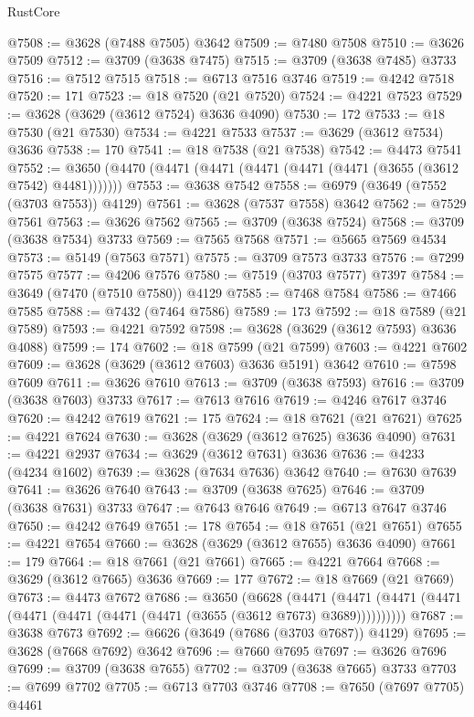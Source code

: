 \begin{lexlean}{RustCore}
\begin{coremodule}
@7508 := @3628 (@7488 @7505) @3642
@7509 := @7480 @7508
@7510 := @3626 @7509
@7512 := @3709 (@3638 @7475)
@7515 := @3709 (@3638 @7485) @3733
@7516 := @7512 @7515
@7518 := @6713 @7516 @3746
@7519 := @4242 @7518
@7520 := 171
@7523 := @18 @7520 (@21 @7520)
@7524 := @4221 @7523
@7529 := @3628 (@3629 (@3612 @7524) @3636 @4090)
@7530 := 172
@7533 := @18 @7530 (@21 @7530)
@7534 := @4221 @7533
@7537 := @3629 (@3612 @7534) @3636
@7538 := 170
@7541 := @18 @7538 (@21 @7538)
@7542 := @4473 @7541
@7552 := @3650 (@4470 (@4471 (@4471 (@4471 (@4471 (@4471 (@3655 (@3612 @7542) @4481)))))))
@7553 := @3638 @7542
@7558 := @6979 (@3649 (@7552 (@3703 @7553)) @4129)
@7561 := @3628 (@7537 @7558) @3642
@7562 := @7529 @7561
@7563 := @3626 @7562
@7565 := @3709 (@3638 @7524)
@7568 := @3709 (@3638 @7534) @3733
@7569 := @7565 @7568
@7571 := @5665 @7569 @4534
@7573 := @5149 (@7563 @7571)
@7575 := @3709 @7573 @3733
@7576 := @7299 @7575
@7577 := @4206 @7576
@7580 := @7519 (@3703 @7577) @7397
@7584 := @3649 (@7470 (@7510 @7580)) @4129
@7585 := @7468 @7584
@7586 := @7466 @7585
@7588 := @7432 (@7464 @7586)
@7589 := 173
@7592 := @18 @7589 (@21 @7589)
@7593 := @4221 @7592
@7598 := @3628 (@3629 (@3612 @7593) @3636 @4088)
@7599 := 174
@7602 := @18 @7599 (@21 @7599)
@7603 := @4221 @7602
@7609 := @3628 (@3629 (@3612 @7603) @3636 @5191) @3642
@7610 := @7598 @7609
@7611 := @3626 @7610
@7613 := @3709 (@3638 @7593)
@7616 := @3709 (@3638 @7603) @3733
@7617 := @7613 @7616
@7619 := @4246 @7617 @3746
@7620 := @4242 @7619
@7621 := 175
@7624 := @18 @7621 (@21 @7621)
@7625 := @4221 @7624
@7630 := @3628 (@3629 (@3612 @7625) @3636 @4090)
@7631 := @4221 @2937
@7634 := @3629 (@3612 @7631) @3636
@7636 := @4233 (@4234 @1602)
@7639 := @3628 (@7634 @7636) @3642
@7640 := @7630 @7639
@7641 := @3626 @7640
@7643 := @3709 (@3638 @7625)
@7646 := @3709 (@3638 @7631) @3733
@7647 := @7643 @7646
@7649 := @6713 @7647 @3746
@7650 := @4242 @7649
@7651 := 178
@7654 := @18 @7651 (@21 @7651)
@7655 := @4221 @7654
@7660 := @3628 (@3629 (@3612 @7655) @3636 @4090)
@7661 := 179
@7664 := @18 @7661 (@21 @7661)
@7665 := @4221 @7664
@7668 := @3629 (@3612 @7665) @3636
@7669 := 177
@7672 := @18 @7669 (@21 @7669)
@7673 := @4473 @7672
@7686 := @3650
    (@6628
      (@4471 (@4471 (@4471 (@4471 (@4471 (@4471 (@4471 (@4471 (@3655 (@3612 @7673) @3689))))))))))
@7687 := @3638 @7673
@7692 := @6626 (@3649 (@7686 (@3703 @7687)) @4129)
@7695 := @3628 (@7668 @7692) @3642
@7696 := @7660 @7695
@7697 := @3626 @7696
@7699 := @3709 (@3638 @7655)
@7702 := @3709 (@3638 @7665) @3733
@7703 := @7699 @7702
@7705 := @6713 @7703 @3746
@7708 := @7650 (@7697 @7705) @4461

\end{coremodule}
\end{lexlean}
